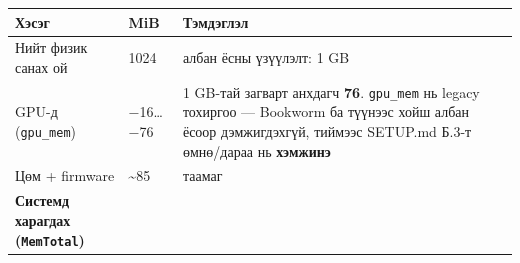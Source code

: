 \begingroup\scriptsize\begin{longtable}[]{@{}lll@{}}
\toprule
\begin{minipage}[b]{0.30\columnwidth}\raggedright
Хэсэг\strut
\end{minipage} & \begin{minipage}[b]{0.30\columnwidth}\raggedright
MiB\strut
\end{minipage} & \begin{minipage}[b]{0.30\columnwidth}\raggedright
Тэмдэглэл\strut
\end{minipage}\tabularnewline
\midrule
\endhead
\begin{minipage}[t]{0.30\columnwidth}\raggedright
Нийт физик санах ой\strut
\end{minipage} & \begin{minipage}[t]{0.30\columnwidth}\raggedright
1024\strut
\end{minipage} & \begin{minipage}[t]{0.30\columnwidth}\raggedright
албан ёсны үзүүлэлт: 1 GB\strut
\end{minipage}\tabularnewline
\begin{minipage}[t]{0.30\columnwidth}\raggedright
GPU-д (\texttt{gpu\_mem})\strut
\end{minipage} & \begin{minipage}[t]{0.30\columnwidth}\raggedright
−16\ldots−76\strut
\end{minipage} & \begin{minipage}[t]{0.30\columnwidth}\raggedright
1 GB-тай загварт анхдагч \textbf{76}. \texttt{gpu\_mem} нь legacy тохиргоо --- Bookworm ба түүнээс хойш албан ёсоор дэмжигдэхгүй, тиймээс SETUP.md Б.3-т өмнө/дараа нь \textbf{хэмжинэ}\strut
\end{minipage}\tabularnewline
\begin{minipage}[t]{0.30\columnwidth}\raggedright
Цөм + firmware\strut
\end{minipage} & \begin{minipage}[t]{0.30\columnwidth}\raggedright
\textasciitilde85\strut
\end{minipage} & \begin{minipage}[t]{0.30\columnwidth}\raggedright
таамаг\strut
\end{minipage}\tabularnewline
\begin{minipage}[t]{0.30\columnwidth}\raggedright
\textbf{Системд харагдах (\texttt{MemTotal})}\strut
\end{minipage} & \begin{minipage}[t]{0.30\columnwidth}\raggedright

\end{minipage}
\end{longtable}
